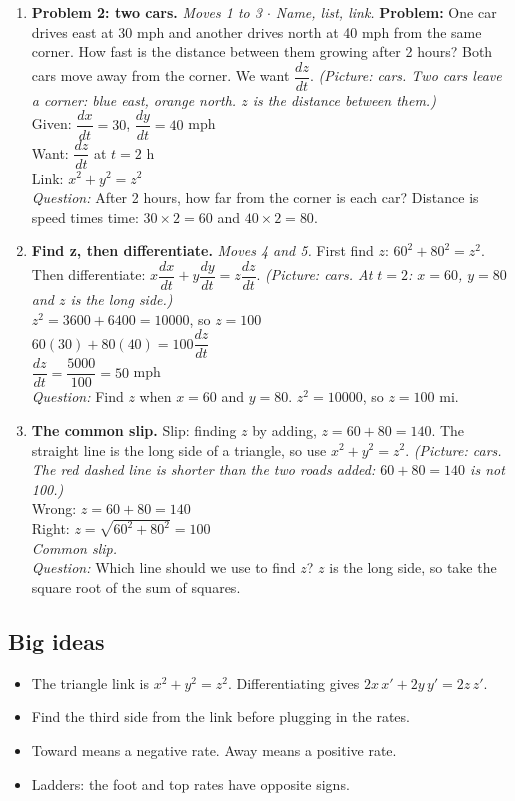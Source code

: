 \documentclass[11pt]{article}
\begin{document}
\begin{enumerate}
\item \textbf{Problem 2: two cars.} \textit{Moves 1 to 3 $\cdot$ Name, list, link.} \textbf{Problem:} One car drives east at 30 mph and another drives north at 40 mph from the same corner. How fast is the distance between them growing after 2 hours? Both cars move away from the corner. We want $\dfrac{dz}{dt}$. \textit{(Picture: cars. Two cars leave a corner: blue east, orange north. $z$ is the distance between them.)}\\ Given: $\dfrac{dx}{dt}=30$, $\dfrac{dy}{dt}=40$ mph\\ Want: $\dfrac{dz}{dt}$ at $t=2$ h\\ Link: $x^2+y^2=z^2$\\ \textit{Question:} After 2 hours, how far from the corner is each car?  Distance is speed times time: $30\times2=60$ and $40\times2=80$.
\item \textbf{Find z, then differentiate.} \textit{Moves 4 and 5.} First find $z$: $60^2+80^2=z^2$. Then differentiate: $x\dfrac{dx}{dt}+y\dfrac{dy}{dt}=z\dfrac{dz}{dt}$. \textit{(Picture: cars. At $t=2$: $x=60$, $y=80$ and $z$ is the long side.)}\\ $z^2=3600+6400=10000$, so $z=100$\\ $60(30)+80(40)=100\dfrac{dz}{dt}$\\ $\dfrac{dz}{dt}=\dfrac{5000}{100}=50$ mph\\ \textit{Question:} Find $z$ when $x=60$ and $y=80$.  $z^2=10000$, so $z=100$ mi.
\item \textbf{The common slip.} Slip: finding $z$ by adding, $z=60+80=140$. The straight line is the long side of a triangle, so use $x^2+y^2=z^2$. \textit{(Picture: cars. The red dashed line is shorter than the two roads added: $60+80=140$ is not 100.)}\\ Wrong: $z=60+80=140$\\ Right: $z=\sqrt{60^2+80^2}=100$\\ \textit{Common slip.}\\ \textit{Question:} Which line should we use to find $z$?  $z$ is the long side, so take the square root of the sum of squares.
\end{enumerate}
\subsection*{Big ideas}\begin{itemize}\item The triangle link is $x^2+y^2=z^2$. Differentiating gives $2x\,x'+2y\,y'=2z\,z'$.
\item Find the third side from the link before plugging in the rates.
\item Toward means a negative rate. Away means a positive rate.
\item Ladders: the foot and top rates have opposite signs.\end{itemize}
\end{document}
